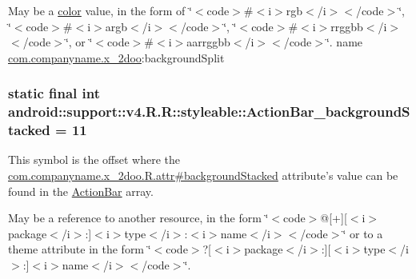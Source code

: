 May be a \hyperlink{classandroid_1_1support_1_1v4_1_1_r_1_1color}{color} value, in the form of \char`\"{}$<$code$>$\#$<$i$>$rgb$<$/i$>$$<$/code$>$\char`\"{}, \char`\"{}$<$code$>$\#$<$i$>$argb$<$/i$>$$<$/code$>$\char`\"{}, \char`\"{}$<$code$>$\#$<$i$>$rrggbb$<$/i$>$$<$/code$>$\char`\"{}, or \char`\"{}$<$code$>$\#$<$i$>$aarrggbb$<$/i$>$$<$/code$>$\char`\"{}.  name \hyperlink{namespacecom_1_1companyname_1_1x__2doo}{com.companyname.x\_\-2doo}:backgroundSplit \hypertarget{classandroid_1_1support_1_1v4_1_1_r_1_1styleable_afd1ae650dce54259899787ed8768401}{
\subsubsection[{ActionBar\_\-backgroundStacked}]{\setlength{\rightskip}{0pt plus 5cm}static final int android::support::v4.R.R::styleable::ActionBar\_\-backgroundStacked = 11}}
\label{classandroid_1_1support_1_1v4_1_1_r_1_1styleable_afd1ae650dce54259899787ed8768401}


This symbol is the offset where the \hyperlink{classcom_1_1companyname_1_1x__2doo_1_1_r_1_1attr_34699025aead7061586c9065b72903df}{com.companyname.x\_\-2doo.R.attr\#backgroundStacked} attribute's value can be found in the \hyperlink{classandroid_1_1support_1_1v4_1_1_r_1_1styleable_5c6cf2c83551ebae05f365bb913fdddf}{ActionBar} array.

May be a reference to another resource, in the form \char`\"{}$<$code$>$@\mbox{[}+\mbox{]}\mbox{[}$<$i$>$package$<$/i$>$:\mbox{]}$<$i$>$type$<$/i$>$:$<$i$>$name$<$/i$>$$<$/code$>$\char`\"{} or to a theme attribute in the form \char`\"{}$<$code$>$?\mbox{[}$<$i$>$package$<$/i$>$:\mbox{]}\mbox{[}$<$i$>$type$<$/i$>$:\mbox{]}$<$i$>$name$<$/i$>$$<$/code$>$\char`\"{}. 

